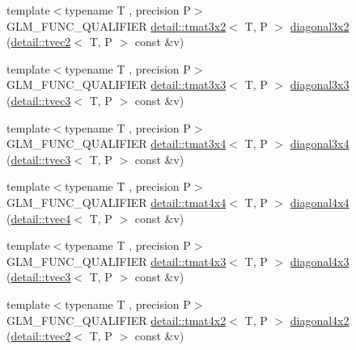 \begin{DoxyCompactItemize}
{\footnotesize template$<$typename T , precision P$>$ }\\G\+L\+M\+\_\+\+F\+U\+N\+C\+\_\+\+Q\+U\+A\+L\+I\+F\+I\+ER \hyperlink{structglm_1_1detail_1_1tmat3x2}{detail\+::tmat3x2}$<$ T, P $>$ \hyperlink{group__gtx__matrix__operation_gabf8e8445e2884aeaa35f0ec32ba5bd01}{diagonal3x2} (\hyperlink{structglm_1_1detail_1_1tvec2}{detail\+::tvec2}$<$ T, P $>$ const \&v)
\item 
{\footnotesize template$<$typename T , precision P$>$ }\\G\+L\+M\+\_\+\+F\+U\+N\+C\+\_\+\+Q\+U\+A\+L\+I\+F\+I\+ER \hyperlink{structglm_1_1detail_1_1tmat3x3}{detail\+::tmat3x3}$<$ T, P $>$ \hyperlink{group__gtx__matrix__operation_gaa49be0f424ad2f3015c5945c13a5fad0}{diagonal3x3} (\hyperlink{structglm_1_1detail_1_1tvec3}{detail\+::tvec3}$<$ T, P $>$ const \&v)
\item 
{\footnotesize template$<$typename T , precision P$>$ }\\G\+L\+M\+\_\+\+F\+U\+N\+C\+\_\+\+Q\+U\+A\+L\+I\+F\+I\+ER \hyperlink{structglm_1_1detail_1_1tmat3x4}{detail\+::tmat3x4}$<$ T, P $>$ \hyperlink{group__gtx__matrix__operation_gab96c533557a191bd972300868f8111ef}{diagonal3x4} (\hyperlink{structglm_1_1detail_1_1tvec3}{detail\+::tvec3}$<$ T, P $>$ const \&v)
\item 
{\footnotesize template$<$typename T , precision P$>$ }\\G\+L\+M\+\_\+\+F\+U\+N\+C\+\_\+\+Q\+U\+A\+L\+I\+F\+I\+ER \hyperlink{structglm_1_1detail_1_1tmat4x4}{detail\+::tmat4x4}$<$ T, P $>$ \hyperlink{group__gtx__matrix__operation_ga0c286e9aa92074f12663617cfedfa72c}{diagonal4x4} (\hyperlink{structglm_1_1detail_1_1tvec4}{detail\+::tvec4}$<$ T, P $>$ const \&v)
\item 
{\footnotesize template$<$typename T , precision P$>$ }\\G\+L\+M\+\_\+\+F\+U\+N\+C\+\_\+\+Q\+U\+A\+L\+I\+F\+I\+ER \hyperlink{structglm_1_1detail_1_1tmat4x3}{detail\+::tmat4x3}$<$ T, P $>$ \hyperlink{group__gtx__matrix__operation_gaff804ead2f02ac48c8daf0d44a81d224}{diagonal4x3} (\hyperlink{structglm_1_1detail_1_1tvec3}{detail\+::tvec3}$<$ T, P $>$ const \&v)
\item 
{\footnotesize template$<$typename T , precision P$>$ }\\G\+L\+M\+\_\+\+F\+U\+N\+C\+\_\+\+Q\+U\+A\+L\+I\+F\+I\+ER \hyperlink{structglm_1_1detail_1_1tmat4x2}{detail\+::tmat4x2}$<$ T, P $>$ \hyperlink{group__gtx__matrix__operation_ga1ec0fc953d871fc9894bcfcc81dbaf68}{diagonal4x2} (\hyperlink{structglm_1_1detail_1_1tvec2}{detail\+::tvec2}$<$ T, P $>$ const \&v)

\end{DoxyCompactItemize}
